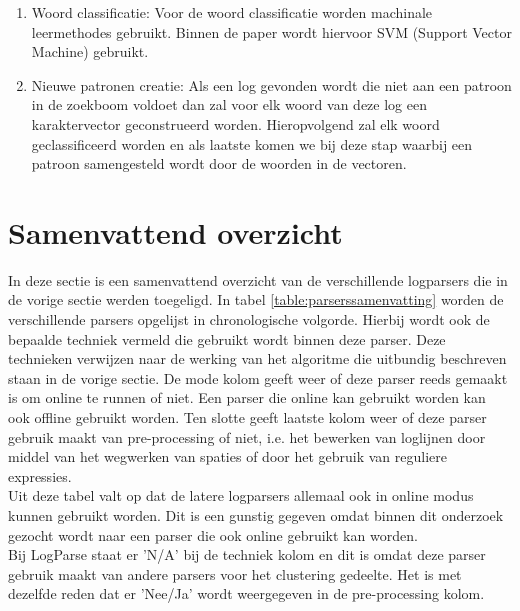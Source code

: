 \begin{itemize}
\begin{enumerate}
        \item Woord classificatie: Voor de woord classificatie worden machinale leermethodes gebruikt. Binnen de paper wordt hiervoor SVM (Support Vector Machine) gebruikt.
        
        \item Nieuwe patronen creatie: Als een log gevonden wordt die niet aan een patroon in de zoekboom voldoet dan zal voor elk woord van deze log een karaktervector geconstrueerd worden. Hieropvolgend zal elk woord geclassificeerd worden en als laatste komen we bij deze stap waarbij een patroon samengesteld wordt door de woorden in de vectoren.
    \end{enumerate}
\end{itemize}

\section{Samenvattend overzicht}
In deze sectie is een samenvattend overzicht van de verschillende logparsers die in de vorige sectie werden toegeligd. In tabel \ref{table:parserssamenvatting} worden de verschillende parsers opgelijst in chronologische volgorde. Hierbij wordt ook de bepaalde techniek vermeld die gebruikt wordt binnen deze parser. Deze technieken verwijzen naar de werking van het algoritme die uitbundig beschreven staan in de vorige sectie. De mode kolom geeft weer of deze parser reeds gemaakt is om online te runnen of niet. Een parser die online kan gebruikt worden kan ook offline gebruikt worden. Ten slotte geeft laatste kolom weer of deze parser gebruik maakt van pre-processing of niet, i.e. het bewerken van loglijnen door middel van het wegwerken van spaties of door het gebruik van reguliere expressies.\\

Uit deze tabel valt op dat de latere logparsers allemaal ook in online modus kunnen gebruikt worden. Dit is een gunstig gegeven omdat binnen dit onderzoek gezocht wordt naar een parser die ook online gebruikt kan worden. \\

Bij LogParse staat er 'N/A' bij de techniek kolom en dit is omdat deze parser gebruik maakt van andere parsers voor het clustering gedeelte. Het is met dezelfde reden dat er 'Nee/Ja' wordt weergegeven in de pre-processing kolom.

